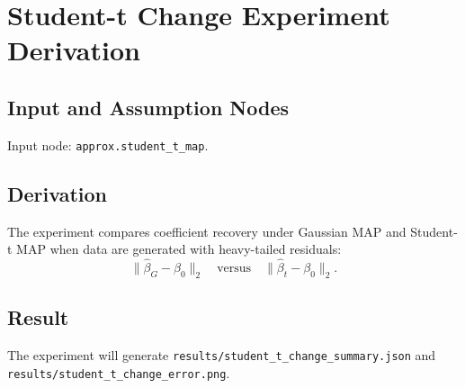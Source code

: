 \section{Student-t Change Experiment Derivation}
\label{deriv:student-t-change-experiment}

\subsection{Input and Assumption Nodes}
Input node: \texttt{approx.student\_t\_map}.

\subsection{Derivation}
The experiment compares coefficient recovery under Gaussian MAP and Student-t MAP when data are generated with heavy-tailed residuals:
\[
  \|\widehat{\beta}_{G}-\beta_0\|_2
  \quad\text{versus}\quad
  \|\widehat{\beta}_{t}-\beta_0\|_2.
\]

\subsection{Result}
The experiment will generate \texttt{results/student\_t\_change\_summary.json} and \texttt{results/student\_t\_change\_error.png}.

